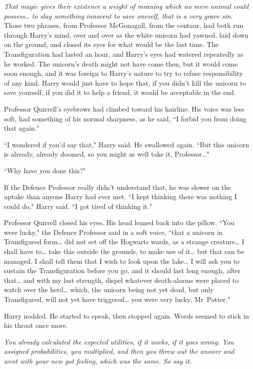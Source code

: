 \emph{That magic gives their existence a weight of meaning which no mere animal could possess{\ldots} to slay something innocent to save oneself, that is a very grave sin.} Those two phrases, from Professor McGonagall, from the centaur, had both run through Harry's mind, over and over as the white unicorn had yawned, laid down on the ground, and closed its eyes for what would be the last time. The Transfiguration had lasted an hour, and Harry's eyes had watered repeatedly as he worked. The unicorn's death might not have come then, but it would come soon enough, and it was foreign to Harry's nature to try to refuse responsibility of any kind. Harry would just have to hope that, if you didn't kill the unicorn to save yourself, if you did it to help a friend, it would be acceptable in the end.

Professor Quirrell's eyebrows had climbed toward his hairline. His voice was less soft, had something of his normal sharpness, as he said, ``I forbid you from doing that again."

``I wondered if you'd say that," Harry said. He swallowed again. ``But this unicorn is already, already doomed, so you might as well take it, Professor{\ldots}"

``Why have you done this?"

If the Defence Professor really didn't understand that, he was slower on the uptake than anyone Harry had ever met. ``I kept thinking there was nothing I could do," Harry said. ``I got tired of thinking it."

Professor Quirrell closed his eyes. His head leaned back into the pillow. ``You were lucky," the Defence Professor said in a soft voice, ``that a unicorn in Transfigured form{\ldots} did not set off the Hogwarts wards, as a strange creature{\ldots} I shall have to{\ldots} take this outside the grounds, to make use of it{\ldots} but that can be managed. I shall tell them that I wish to look upon the lake{\ldots} I will ask you to sustain the Transfiguration before you go, and it should last long enough, after that{\ldots} and with my last strength, dispel whatever death-alarms were placed to watch over the herd{\ldots} which, the unicorn being not yet dead, but only Transfigured, will not yet have triggered{\ldots} you were very lucky, Mr~Potter."

Harry nodded. He started to speak, then stopped again. Words seemed to stick in his throat once more.

\emph{You already calculated the expected utilities, if it works, if it goes wrong. You assigned probabilities, you multiplied, and then you threw out the answer and went with your new gut feeling, which was the same. So say it.}

